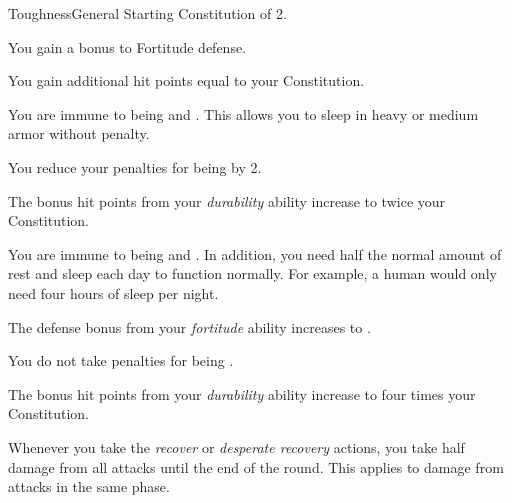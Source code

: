     \begin{feat}{Toughness}{General}
        \featpre Starting Constitution of 2.

         You gain a  bonus to Fortitude defense.

         You gain additional hit points equal to your Constitution.

         You are immune to being  and .
        This allows you to sleep in heavy or medium armor without penalty.

         You reduce your penalties for being  by 2.

         The bonus hit points from your \textit{durability} ability increase to twice your Constitution.

         You are immune to being  and .
        In addition, you need half the normal amount of rest and sleep each day to function normally.
        For example, a human would only need four hours of sleep per night.

         The defense bonus from your \textit{fortitude} ability increases to .

         You do not take penalties for being .

         The bonus hit points from your \textit{durability} ability increase to four times your Constitution.

         Whenever you take the \textit{recover} or \textit{desperate recovery} actions, you take half damage from all attacks until the end of the round.
        This applies to damage from attacks in the same phase.
    \end{feat}

